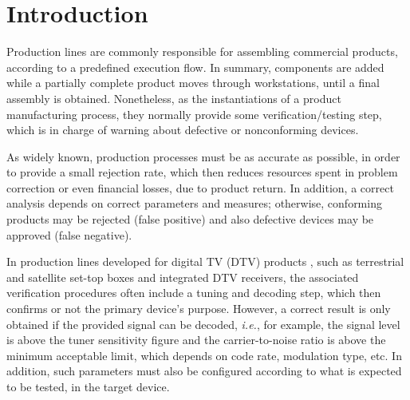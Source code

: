 \documentclass[conference]{IEEEtran}
\begin{document}




%
\IEEEpeerreviewmaketitle



\section{Introduction}
\label{intro}

Production lines are commonly responsible for assembling commercial products, according to a predefined execution flow. In summary, components are added while a partially complete product moves through workstations, until a final assembly is obtained. Nonetheless, as the instantiations of a product manufacturing process, they normally provide some verification/testing step, which is in charge of warning about defective or nonconforming devices.

As widely known, production processes must be as accurate as possible, in order to provide a small rejection rate, which then reduces resources spent in problem correction or even financial losses, due to product return. In addition, a correct analysis depends on correct parameters and measures; otherwise, conforming products may be rejected (false positive) and also defective devices may be approved (false negative).

In production lines developed for digital TV (DTV) products \cite{keith}, such as terrestrial and satellite set-top boxes and integrated DTV receivers, the associated verification procedures often include a tuning and decoding step, which then confirms or not the primary device's purpose. However, a correct result is only obtained if the provided signal can be decoded, {\it i.e.}, for example, the signal level is above the tuner sensitivity figure and the carrier-to-noise ratio is above the minimum acceptable limit, which depends on code rate, modulation type, etc. In addition, such parameters must also be configured according to what is expected to be tested, in the target device.%
\end{document}
